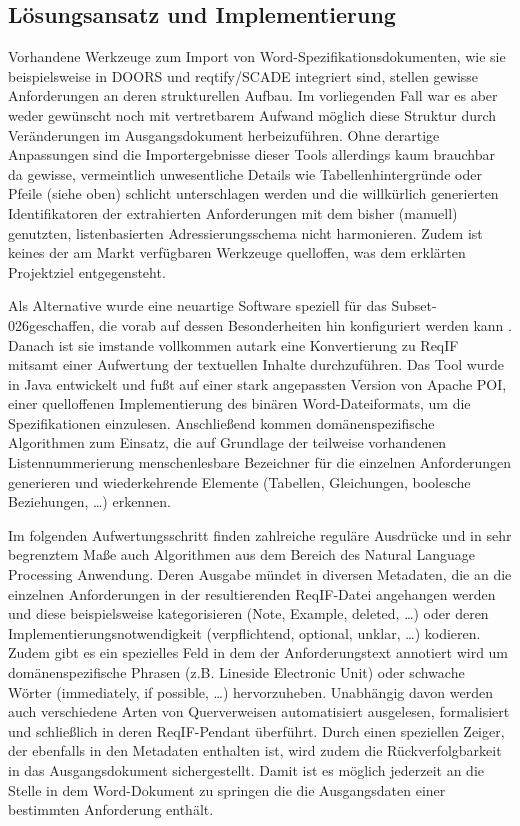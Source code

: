 \documentclass[twoside]{article}
\begin{document}
\begin{multicols}{2}
\subsection{Lösungsansatz und Implementierung}

Vorhandene Werkzeuge zum Import von Word-Spezifikationsdokumenten, wie sie beispielsweise in DOORS und reqtify/SCADE integriert sind, stellen gewisse Anforderungen an deren strukturellen Aufbau. Im vorliegenden Fall war es aber weder gewünscht noch mit vertretbarem Aufwand möglich diese Struktur durch Veränderungen im Ausgangsdokument herbeizuführen. Ohne derartige Anpassungen sind die Importergebnisse dieser Tools allerdings kaum brauchbar da gewisse, vermeintlich unwesentliche Details wie Tabellenhintergründe oder Pfeile (siehe oben) schlicht unterschlagen werden und die willkürlich generierten Identifikatoren der extrahierten Anforderungen mit dem bisher (manuell) genutzten, listenbasierten Adressierungsschema nicht harmonieren. Zudem ist keines der am Markt verfügbaren Werkzeuge quelloffen, was dem erklärten Projektziel entgegensteht.

Als Alternative wurde eine neuartige Software speziell für das \glqq{}Subset-026\grqq{}geschaffen, die vorab auf dessen Besonderheiten hin konfiguriert werden kann \cite{TodoMoriz}. Danach ist sie imstande vollkommen autark eine Konvertierung zu ReqIF mitsamt einer Aufwertung der textuellen Inhalte durchzuführen. Das Tool wurde in Java entwickelt und fußt auf einer stark angepassten Version von Apache POI, einer quelloffenen Implementierung des binären Word-Dateiformats, um die Spezifikationen einzulesen. Anschließend kommen domänenspezifische Algorithmen zum Einsatz, die auf Grundlage der teilweise vorhandenen Listennummerierung menschenlesbare Bezeichner für die einzelnen Anforderungen generieren und wiederkehrende Elemente (Tabellen, Gleichungen, boolesche Beziehungen, \ldots{}) erkennen.

Im folgenden Aufwertungsschritt finden zahlreiche reguläre Ausdrücke und in sehr begrenztem Maße auch Algorithmen aus dem Bereich des Natural Language Processing Anwendung. Deren Ausgabe mündet in diversen Metadaten, die an die einzelnen Anforderungen in der resultierenden ReqIF-Datei angehangen werden und diese beispielsweise kategorisieren (Note, Example, deleted, \ldots ) oder deren Implementierungsnotwendigkeit (verpflichtend, optional, unklar, \ldots ) kodieren. Zudem gibt es ein spezielles Feld in dem der Anforderungstext annotiert wird um domänenspezifische Phrasen (z.B. \glqq Lineside Electronic Unit\grqq ) oder schwache Wörter (\glqq{}immediately\grqq{}, \glqq{}if possible\grqq{}, \ldots{}) hervorzuheben. Unabhängig davon werden auch verschiedene Arten von Querverweisen automatisiert ausgelesen, formalisiert und schließlich in deren ReqIF-Pendant überführt. Durch einen speziellen Zeiger, der ebenfalls in den Metadaten enthalten ist, wird zudem die Rückverfolgbarkeit in das Ausgangsdokument sichergestellt. Damit ist es möglich jederzeit an die Stelle in dem Word-Dokument zu springen die die Ausgangsdaten einer bestimmten Anforderung enthält.


\end{multicols}
\end{document}
